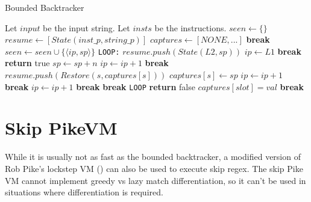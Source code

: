 \begin{algorithm}
\caption{Bounded Backtracker}
\label{algo:loopboundedback}

\begin{algorithmic}
\State Let $input$ be the input string.
\State Let $insts$ be the instructions.
  \State $seen \gets \{\}$
  \State $resume \gets [State(inst\_p, string\_p)]$
  \State $captures \gets [NONE, ...]$
          \State \textbf{break}
        \EndIf
        \State $seen \gets seen \cup \{\langle ip, sp \rangle\}$
        \State \verb'LOOP:'
              \State $resume.push(State(L2, sp))$
              \State $ip \gets L1$
              \State \textbf{break}
            \EndCase
              \State \textbf{return} true
            \EndCase
              \State $sp \gets sp + n$
              \State $ip \gets ip + 1$
              \State \textbf{break}
            \EndCase
              \State $resume.push(Restore(s, captures[s]))$
              \State $captures[s] \gets sp$
              \State $ip \gets ip + 1$
              \State \textbf{break}
            \EndCase
                \State $ip \gets ip + 1$
                \State \textbf{break}
              \Else
                \State \textbf{break} \verb'LOOP'
              \EndIf
            \EndCase
          \EndSwitch
        \EndWhile
        \State \textbf{return} false
      \EndCase
        \State $captures[slot] = val$
        \State \textbf{break}
      \EndCase
    \EndSwitch
  \EndWhile
\EndProcedure
\end{algorithmic}
\end{algorithm}

\section{Skip PikeVM}

While it is usually not as fast as the bounded backtracker,
a modified version of Rob Pike's lockstep VM (\cite{Pike1987})
can also be used to execute skip regex. The skip Pike VM cannot
implement greedy vs lazy match differentiation, so it can't be
used in situations where differentiation is required.

